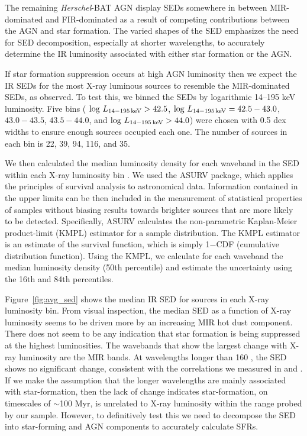 \documentclass[fleqn, usenatbib]{mnras}
\newcommand{\herschel}{\emph{Herschel}}
\begin{document}
The remaining \herschel-BAT AGN display SEDs somewhere in between MIR-dominated and FIR-dominated as a result of competing contributions between the AGN and star formation. The varied shapes of the SED emphasizes the need for SED decomposition, especially at shorter wavelengths, to accurately determine the IR luminosity associated with either star formation or the AGN. 

If star formation suppression occurs at high AGN luminosity then we expect the IR SEDs for the most X-ray luminous sources to resemble the MIR-dominated SEDs, as \citet{Barger:2015ly} observed. To test this, we binned the SEDs by logarithmic 14--195 keV luminosity. Five bins ( $\log\,L_{\rm 14-195\,keV} > 42.5$, $\log\,L_{\rm 14-195\,keV} = 42.5-43.0$, $43.0-43.5$, $43.5-44.0$, and $\log\,L_{\rm 14-195\,keV} > 44.0$) were chosen with 0.5 dex widths to ensure enough sources occupied each one. The number of sources in each bin is 22, 39, 94, 116, and 35. 

We then calculated the median luminosity density {\color{red}for each waveband in the SED} within each X-ray luminosity bin . We used the ASURV \citep{Feigelson:1985lr} package, which applies the principles of survival analysis to astronomical data. Information contained in the upper limits can be then included in the measurement of statistical properties of samples without biasing results towards brighter sources that are more likely to be detected. Specifically, ASURV calculates the non-parametric Kaplan-Meier product-limit (KMPL) estimator for a sample distribution. The KMPL estimator is an estimate of the survival function, which is simply 1$-$CDF (cumulative distribution function). Using the KMPL, we calculate for each waveband the median luminosity density (50th percentile) and estimate the uncertainty using the 16th and 84th percentiles. 

Figure~\ref{fig:avg_sed} shows the median IR SED for sources in each X-ray luminosity bin. From visual inspection, the median SED as a function of X-ray luminosity seems to be driven more by an increasing MIR hot dust component. There does not seem to be any indication that star formation is being suppressed at the highest luminosities. The wavebands that show the largest change with X-ray luminosity are the MIR bands. At wavelengths longer than 160 \micron, the SED shows no significant change, consistent with the correlations we measured in \citet{Melendez:2014yu} and \citet{Shimizu:2016qy}. If we make the assumption that the longer wavelengths are mainly associated with star-formation, then the lack of change indicates star-formation{\color{red}, on timescales of $\sim$100 Myr,} is unrelated to X-ray luminosity within the range probed by our sample. However, to definitively test this we need to decompose the SED into star-forming and AGN components to accurately calculate SFRs.
\end{document}
